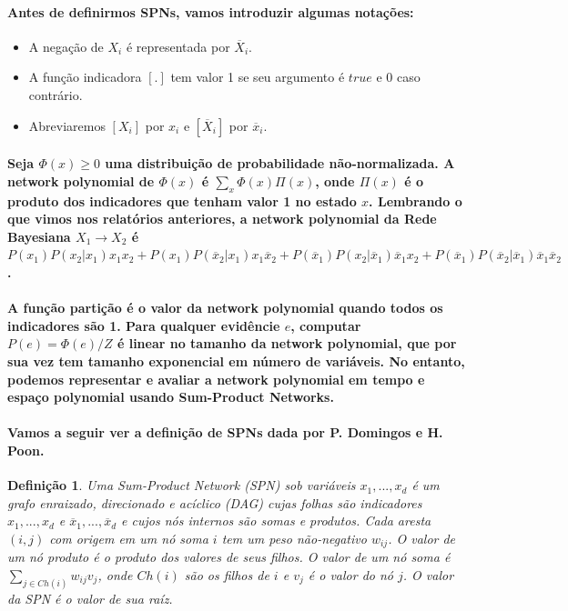 \documentclass[a4paper,10pt]{article}
\theoremstyle{plain}
\newtheorem*{spn-def}{Definição}
\begin{document}
\paragraph{
  Antes de definirmos SPNs, vamos introduzir algumas notações:
}

\begin{itemize}
  \item A negação de $X_i$ é representada por $\overline{X}_i$.
  \item A função indicadora\cite{report-1} $[.]$ tem valor 1 se seu argumento é $true$ e 0 caso
    contrário.
  \item Abreviaremos $[X_i]$ por $x_i$ e $[\overline{X}_i]$ por $\overline{x}_i$.
\end{itemize}

\paragraph{
  Seja $\Phi(x) \geq 0$ uma distribuição de probabilidade não-normalizada. A network polynomial
  \cite{report-1} de $\Phi(x)$ é $\sum_x \Phi(x) \Pi (x)$, onde $\Pi(x)$ é o produto dos
  indicadores que tenham valor 1 no estado $x$. Lembrando o que vimos nos relatórios anteriores,
  a network polynomial da Rede Bayesiana $X_1 \to X_2$ é $P(x_1)P(x_2|x_1)x_1x_2+P(x_1)
  P(\overline{x}_2|x_1)x_1\overline{x}_2+P(\overline{x}_1)P(x_2|\overline{x}_1)\overline{x}_1x_2+
  P(\overline{x}_1)P(\overline{x}_2|\overline{x}_1)\overline{x}_1\overline{x}_2$.
}

\paragraph{
  A função partição é o valor da network polynomial quando todos os indicadores são 1. Para
  qualquer evidêncie $e$, computar $P(e)=\Phi(e)/Z$ é linear no tamanho da network polynomial, que
  por sua vez tem tamanho exponencial em número de variáveis. No entanto, podemos representar e
  avaliar a network polynomial em tempo e espaço polynomial usando Sum-Product Networks.
}

\paragraph{
  Vamos a seguir ver a definição de SPNs dada por P. Domingos e H. Poon\cite{poon-domingos}.
}

\begin{spn-def} Uma Sum-Product Network (SPN) sob variáveis $x_1,...,x_d$ é um grafo enraizado,
  direcionado e acíclico (DAG) cujas folhas são indicadores $x_1,...,x_d$ e $\overline{x}_1,...,
  \overline{x}_d$ e cujos nós internos são somas e produtos. Cada aresta $(i,j)$ com origem em um
  nó soma $i$ tem um peso não-negativo $w_{ij}$. O valor de um nó produto é o produto dos valores
  de seus filhos. O valor de um nó soma é $\sum_{j \in Ch(i)} w_{ij}v_j$, onde $Ch(i)$ são os
  filhos de $i$ e $v_j$ é o valor do nó $j$. O valor da SPN é o valor de sua raíz.
\end{spn-def}
\end{document}
